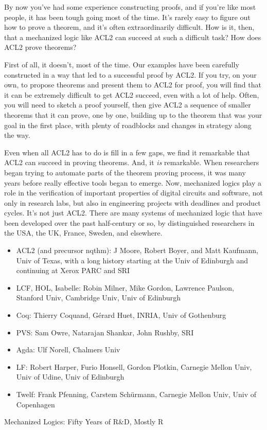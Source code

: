 By now you've had some experience constructing proofs, and if you're like most people,
it has been tough going most of the time.
It's rarely easy to figure out how to prove a theorem,
and it's often extraordinarily difficult.
How is it, then, that a mechanized logic like ACL2 can succeed at such a difficult task?
How does ACL2 prove theorems?

First of all, it doesn't, most of the time.
Our examples have been carefully constructed in a way that
led to a successful proof by ACL2.
If you try, on your own, to propose theorems
and present them to ACL2 for proof, you will find that it can be
extremely difficult to get ACL2 succeed, even with a lot of help.
Often, you will need to sketch a proof yourself,
then give ACL2 a sequence of smaller theorems
that it can prove, one by one, building up to
the theorem that was your goal in the first place,
with plenty of roadblocks and changes in strategy along the way.

Even when all ACL2 has to do is fill in a few gaps,
we find it remarkable that ACL2 can succeed in proving theorems.
And, it \emph{is} remarkable.
When researchers began trying to automate parts
of the theorem proving process, it was many years
before really effective tools began to emerge.
Now, mechanized logics play a role in
the verification of important properties of digital circuits and
software, not only in research labs,
but also in engineering projects with deadlines and product cycles.
It's not just ACL2. There are many systems of mechanized logic that
have been developed over the past half-century or so,
by distinguished researchers in the USA, the UK, France, Sweden, and elsewhere.

\begin{aside}
\begin{itemize}
\item ACL2 (and precursor nqthm): J Moore, Robert Boyer, and Matt Kaufmann, Univ of Texas, with a long history starting at the Univ of Edinburgh and continuing at Xerox PARC and SRI
\item LCF, HOL, Isabelle: Robin Milner, Mike Gordon, Lawrence Paulson, Stanford Univ, Cambridge Univ, Univ of Edinburgh
\item Coq: Thierry Coquand, G\'erard Huet, INRIA, Univ of Gothenburg
\item PVS: Sam Owre, Natarajan Shankar, John Rushby, SRI
\item Agda: Ulf Norell, Chalmers Univ
\item LF: Robert Harper, Furio Honsell, Gordon Plotkin, Carnegie Mellon Univ, Univ of Udine, Univ of Edinburgh
\item Twelf: Frank Pfenning, Carstem Sch\"urmann, Carnegie Mellon Univ, Univ of Copenhagen
\end{itemize}
\caption{Mechanized Logics: Fifty Years of R\&D, Mostly R}
\label{mechanized-logic-history}
\end{aside}

